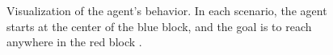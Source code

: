 \documentclass[letterpaper, 10 pt, conference]{ieeeconf}  %
\begin{document}
\begin{figure}[thpb]
        \centering
  \caption{Visualization of the agent’s behavior. In each scenario, the agent starts at the center of the
  blue block, and the goal is to reach anywhere in the red block \cite{duanRLFastReinforcement2016}. 
  }
        \label{figurelabel}
     \end{figure}
\end{document}
